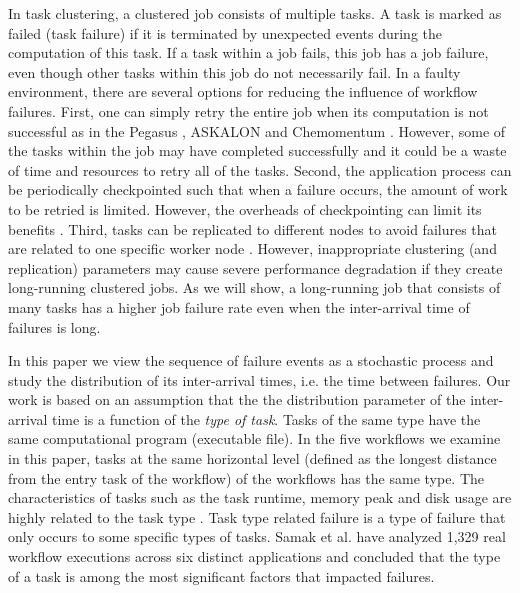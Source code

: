 \documentclass{IOS-Book-Article}
\begin{document}
In task clustering, a clustered job consists of multiple tasks. A task is marked as failed (task failure) if it is terminated by unexpected events during the computation of this task. If a task within a job fails, this job has a job failure, even though other tasks within this job do not necessarily fail. 
In a faulty environment, there are several options for reducing the influence of workflow failures. First, one can simply retry the entire job when its computation is not successful as in the Pegasus \cite{Deelman2004}, ASKALON \cite{fahringer2007askalon} and Chemomentum \cite{schuller2008chemomentum}. However, some of the tasks within the job may have completed successfully and it could be a waste of time and resources to retry all of the tasks. Second, the application process can be periodically checkpointed such that when a failure occurs, the amount of work to be retried is limited. However, the overheads of checkpointing can limit its benefits \cite{Zhang2004}. Third, tasks can be replicated to different nodes to avoid failures that are related to one specific worker node \cite{Plankensteiner2009}. However, inappropriate clustering (and replication) parameters may cause severe performance degradation if they create long-running clustered jobs. As we will show, a long-running job that consists of many tasks has a higher job failure rate even when the inter-arrival time of failures is long. 

In this paper we view the sequence of failure events as a stochastic process and study the distribution of its inter-arrival times, i.e. the time between failures. Our work is based on an assumption that the the distribution parameter of the inter-arrival time is a function of the \emph{type of task}. Tasks of the same type have the same computational program (executable file). In the five workflows we examine in this paper, tasks at the same horizontal level (defined as the longest distance from the entry task of the workflow) of the workflows has the same type. 
The characteristics of tasks such as the task runtime, memory peak and disk usage are highly related to the task type \cite{da2013toward, Juve2013}.
Task type related failure is a type of failure that only occurs to some specific types of tasks. Samak \cite{Samak2011} et al. have analyzed 1,329 real workflow executions across six distinct applications and concluded that the type of a task is among the most significant factors that impacted failures. 
\end{document}

